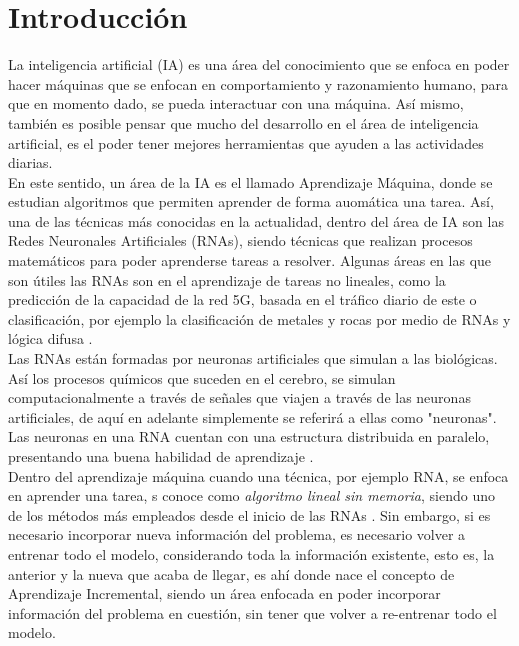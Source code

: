 \chapter{Introducción}
  La inteligencia artificial (IA) es una área del conocimiento que se enfoca en poder hacer máquinas que se enfocan en comportamiento y razonamiento humano, para que en momento dado, se pueda interactuar con una máquina. Así mismo, también es posible pensar que mucho del desarrollo en el área de inteligencia artificial, es el poder tener mejores herramientas que ayuden a las actividades diarias.\\

  En este sentido, un área de la IA es el llamado Aprendizaje Máquina, donde se estudian algoritmos que permiten aprender de forma auomática una tarea.
  Así, una de las técnicas más conocidas en la actualidad, dentro del área de IA son las Redes Neuronales Artificiales (RNAs), siendo técnicas que realizan procesos matemáticos para poder aprenderse tareas a resolver. Algunas áreas en las que son útiles las RNAs son en el aprendizaje de tareas no lineales, como la predicción de la capacidad de la red 5G, basada en el tráfico diario de este \cite{zhao2022} o clasificación, por ejemplo la clasificación de metales y rocas por medio de RNAs y lógica difusa \cite{salazar2013}. \\

  Las RNAs están formadas por neuronas artificiales que simulan a las biológicas. Así los procesos químicos que suceden en el cerebro, se simulan computacionalmente a través de señales que viajen a través de las neuronas artificiales, de aquí en adelante simplemente se referirá a ellas como "neuronas". Las neuronas en una RNA cuentan con una estructura distribuida en paralelo, presentando una buena habilidad de aprendizaje \cite{liu2015}.\\

  Dentro del aprendizaje máquina cuando una técnica, por ejemplo RNA, se enfoca en aprender una tarea, s conoce como \textit{algoritmo lineal sin memoria}, siendo uno de los métodos más empleados desde el inicio de las RNAs \cite{GiraudCarrier2000}. Sin embargo, si es necesario incorporar nueva información del problema,  es necesario volver a entrenar todo el modelo, considerando toda la información existente, esto es, la anterior y la nueva que acaba de llegar, es ahí donde nace el concepto de Aprendizaje Incremental, siendo un área enfocada en poder incorporar información del problema en cuestión, sin tener que volver a re-entrenar todo el modelo.\\


